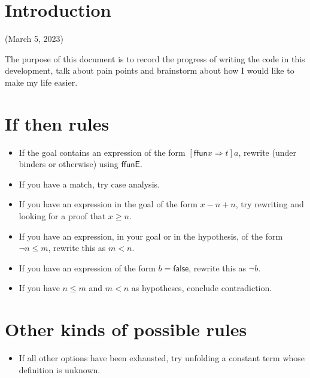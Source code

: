 \documentclass{article}
\begin{document}
\section{Introduction}
(March 5, 2023)

The purpose of this document is to record the progress of writing the
code in this development, talk about pain points and brainstorm about
how I would like to make my life easier.

\section{If then rules}
\begin{itemize}
\item If the goal contains an expression of the form $[ \mathsf{ffun
  }x \Rightarrow t] a$, rewrite (under binders or otherwise) using
  $\mathsf{ffunE}$.
\item If you have a match, try case analysis.
\item If you have an expression in the goal of the form $x - n + n$,
  try rewriting and looking for a proof that $x\geq n$.
\item If you have an expression, in your goal or in the hypothesis, of
  the form $\lnot n \leq m$, rewrite this as $m < n$.
\item If you have an expression of the form $b = \mathsf{false}$,
  rewrite this as $\lnot b$.
\item If you have $n\leq m$ and $m < n$ as hypotheses, conclude contradiction.
\end{itemize}
\section{Other kinds of possible rules}
\begin{itemize}
\item If all other options have been exhausted, try unfolding a
  constant term whose definition is unknown.
\end{itemize}
\end{document}
